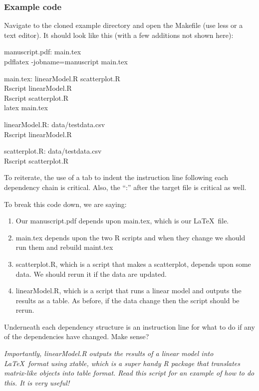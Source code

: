 \documentclass{article}
\begin{document}
\subsubsection{Example code}

Navigate to the cloned example directory and open the Makefile (use {\sf less} or a text editor). It should look like this (with a few additions not shown here): 
\newcommand\tab[1][1cm]{\hspace*{#1}}

\noindent manuscript.pdf: main.tex\\
\tab pdflatex -jobname=manuscript main.tex

\noindent main.tex: linearModel.R scatterplot.R\\
\tab Rscript linearModel.R\\
\tab Rscript scatterplot.R\\
\tab latex main.tex 

\noindent linearModel.R: data/testdata.csv\\
\tab Rscript linearModel.R

\noindent scatterplot.R: data/testdata.csv\\
\tab Rscript scatterplot.R

To reiterate, the use of a tab to indent the instruction line following each dependency chain is critical. Also, the ``:'' after the target file is critical as well.

\noindent To break this code down, we are saying:

\begin{enumerate}
\item Our manuscript.pdf depends upon main.tex, which is our \LaTeX\ file.
\item main.tex depends upon the two R scripts and when they change we should run them and rebuild maint.tex
\item scatterplot.R, which is a script that makes a scatterplot, depends upon some data. We should rerun it if the data are updated.
\item linearModel.R, which is a script that runs a linear model and outputs the results as a table. As before, if the data change then the script should be rerun.
\end{enumerate}

Underneath each dependency structure is an instruction line for what to do if any of the dependencies have changed. {\sf Make} sense?

\emph{Importantly, linearModel.R outputs the results of a linear model into \LaTeX\ format using {\sf xtable}, which is a super handy R package that translates matrix-like objects into table format. Read this script for an example of how to do this. It is very useful!}
\end{document}
